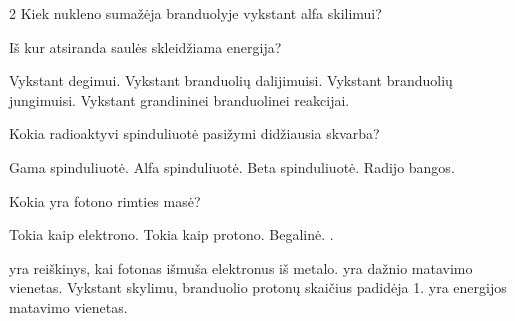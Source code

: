 \documentclass{exam}
\begin{document}
	\begin{center}
	\end{center}
	
	\vspace{5mm}

	\begin{questions}
	\raggedcolumns\begin{multicols}             {2} 
\question Kiek nukleno sumažėja branduolyje vykstant alfa skilimui? \begin{choices}
\end{choices}
\question Iš kur atsiranda saulės skleidžiama energija? \begin{choices}
    \choice Vykstant degimui.
    \choice Vykstant branduolių dalijimuisi.
    \choice Vykstant branduolių jungimuisi.
    \choice Vykstant grandininei branduolinei reakcijai.
\end{choices}
\question Kokia radioaktyvi spinduliuotė pasižymi didžiausia skvarba? \begin{choices}
    \choice Gama spinduliuotė.
    \choice Alfa spinduliuotė.
    \choice Beta spinduliuotė.
    \choice Radijo bangos.
\end{choices}
\question Kokia yra fotono rimties masė? \begin{choices}
    \choice Tokia kaip elektrono.
    \choice Tokia kaip protono.
    \choice Begalinė.
    .
\end{choices}
\end{multicols} 

	\question \fillin[Fotoefektas] yra reiškinys, kai fotonas išmuša elektronus iš metalo.
\question \fillin[Hz] yra dažnio matavimo vienetas.
\question Vykstant \fillin[beta] skylimu, branduolio protonų skaičius padidėja 1.
\question \fillin[J] yra energijos matavimo vienetas.


\end{questions}
\end{document}
